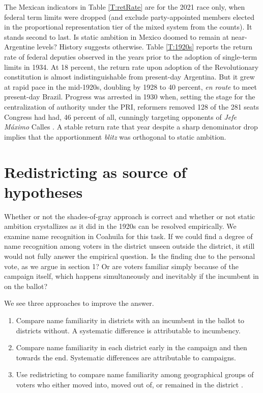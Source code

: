 \documentclass[letter,12pt]{article}
\begin{document}
The Mexican indicators in Table \ref{T:retRate} are for the 2021 race only, when federal term limits were dropped (and exclude party-appointed members elected in the proportional representation tier of the mixed system from the counts). It stands second to last. Is static ambition in Mexico doomed to remain at near-Argentine levels? History suggests otherwise. Table \ref{T:1920s} reports the return rate of federal deputies observed in the years prior to the adoption of single-term limits in 1934. At 18 percent, the return rate upon adoption of the Revolutionary constitution is almost indistinguishable from present-day Argentina. But it grew at rapid pace in the mid-1920s, doubling by 1928 to 40 percent, \emph{en route} to meet present-day Brazil. Progress was arrested in 1930 when, setting the stage for the centralization of authority under the PRI, reformers removed 128 of the 281 seats Congress had had, 46 percent of all, cunningly targeting opponents of \emph{Jefe Máximo} Calles \citep[see][:23]{godoy.reeleccion.2014}. A stable return rate that year despite a sharp denominator drop implies that the apportionment \emph{blitz} was orthogonal to static ambition.

\section{Redistricting as source of hypotheses}

Whether or not the shades-of-gray approach is correct and whether or not static ambition crystallizes as it did in the 1920s can be resolved empirically. We examine name recognition in Coahuila for this task. If we could find a degree of name recognition among voters in the district unseen outside the district, it still would not fully answer the empirical question. Is the finding due to the personal vote, as we argue in section 1? Or are voters familiar simply because of the campaign itself, which happens simultaneously and inevitably if the incumbent in on the ballot?

We see three approaches to improve the answer.

\begin{enumerate}
\item Compare name familiarity in districts with an incumbent in the ballot to districts without. A systematic difference is attributable to incumbency.
\item Compare name familiarity in each district early in the campaign and then towards the end. Systematic differences are attributable to campaigns. 
\item Use redistricting to compare name familiarity among geographical groups of voters who either moved into, moved out of, or remained in the district \citep[see][]{mckee.Redistricting-familiarity.2008}.
\end{enumerate}
\end{document}
